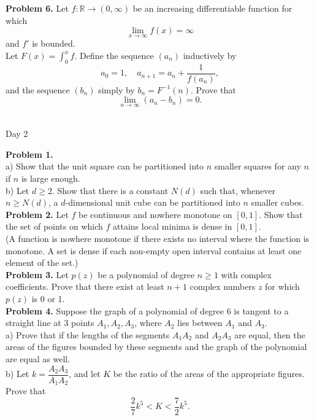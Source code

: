 \documentclass{article}
\begin{document}
\textbf{Problem 6.}
Let \( f : \mathbb{R} \to (0, \infty) \) be an increasing
differentiable function for which
\[
\lim_{x \to \infty} f(x) = \infty
\]
and \( f' \) is bounded.\\

Let \( F(x) = \int_0^x f \). Define the sequence \( (a_n) \) inductively by
\[
a_0 = 1, \quad a_{n+1} = a_n + \frac{1}{f(a_n)},
\]
and the sequence \( (b_n) \) simply by \( b_n = F^{-1}(n) \). Prove that
\[
\lim_{n \to \infty} (a_n - b_n) = 0.
\]
\\

\newpage

\begin{center}
Day 2
\end{center}

\textbf{Problem 1.} \\
a) Show that the unit square can be partitioned into \( n \) smaller squares for any \( n \) if \( n \) is large enough.\\
b) Let \( d \geq 2 \). Show that there is a constant \( N(d) \) such that, whenever \( n \geq N(d) \), a \( d \)-dimensional unit cube can be partitioned into \( n \) smaller cubes.
\\

\textbf{Problem 2.}
Let \( f \) be continuous and nowhere monotone on \( [0, 1] \). Show that the set of points on which \( f \) attains local minima is dense in \( [0, 1] \).\\

\noindent
(A function is nowhere monotone if there exists no interval where the function is monotone. A set is dense if each non-empty open interval contains at least one element of the set.)
\\

\textbf{Problem 3.}
Let \( p(z) \) be a polynomial of degree \( n \ge 1 \) with
complex coefficients.
Prove that there exist at least \( n + 1 \) complex numbers \( z \) for which \( p(z) \) is 0 or 1.
\\

\textbf{Problem 4.}
Suppose the graph of a polynomial of degree 6 is tangent to a straight line at 3 points \( A_1, A_2, A_3 \), where \( A_2 \) lies between \( A_1 \) and \( A_3 \).\\
a) Prove that if the lengths of the segments \( A_1A_2 \) and \( A_2A_3 \) are equal, then the areas of the figures bounded by these segments and the graph of the polynomial are equal as well.\\
b) Let \( k = \dfrac{A_2A_3}{A_1A_2} \), and let \( K \) be the ratio of the areas of the appropriate figures. Prove that
\[
\frac{2}{7}k^5 < K < \frac{7}{2}k^5.
\]
\\
\end{document}
